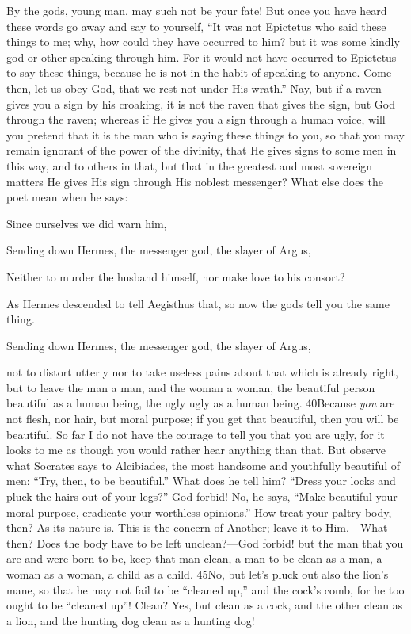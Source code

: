 By the gods, young man, may such not be your fate! But once you have heard these words go away and say to yourself, ``It was not Epictetus who said these things to me; why, how could they have occurred to him? but it was some kindly god or other speaking through him. For it would not have occurred to Epictetus to say these things, because he is not in the habit of speaking to anyone. Come then, let us obey God, that we rest not under His wrath.'' Nay, but if a raven gives you a sign by his croaking, it is not the raven that gives the sign, but God through the raven; whereas if He gives you a sign through a human voice, will you pretend that it is the man who is saying these things to you, so that you may remain ignorant of the power of the divinity, that He gives signs to some men in this way, and to others in that, but that in the greatest and most sovereign matters He gives His sign through His noblest messenger? What else does the poet mean when he says:

Since ourselves we did warn him,

Sending down Hermes, the messenger god, the slayer of Argus,

Neither to murder the husband himself, nor make love to his consort?

As Hermes descended to tell Aegisthus that, so now the gods tell you the same thing.

Sending down Hermes, the messenger god, the slayer of Argus,

not to distort utterly nor to take useless pains about that which is already right, but to leave the man a man, and the woman a woman, the beautiful person beautiful as a human being, the ugly ugly as a human being. 40Because \emph{you} are not flesh, nor hair, but moral purpose; if you get that beautiful, then you will be beautiful. So far I do not have the courage to tell you that you are ugly, for it looks to me as though you would rather hear anything than that. But observe what Socrates says to Alcibiades, the most handsome and youthfully beautiful of men: ``Try, then, to be beautiful.'' What does he tell him? ``Dress your locks and pluck the hairs out of your legs?'' God forbid! No, he says, ``Make beautiful your moral purpose, eradicate your worthless opinions.'' How treat your paltry body, then? As its nature is. This is the concern of Another; leave it to Him.—What then? Does the body have to be left unclean?—God forbid! but the man that you are and were born to be, keep that man clean, a man to be clean as a man, a woman as a woman, a child as a child. 45No, but let's pluck out also the lion's mane, so that he may not fail to be ``cleaned up,'' and the cock's comb, for he too ought to be ``cleaned up''! Clean? Yes, but clean as a cock, and the other clean as a lion, and the hunting dog clean as a hunting dog!

